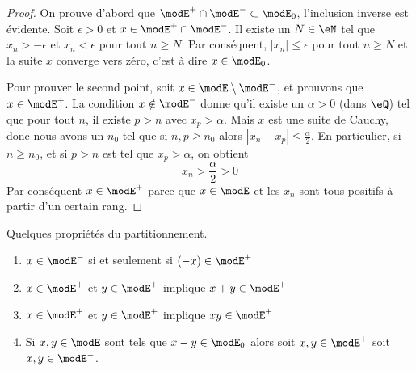 \begin{proof}
    On prouve d'abord que \( \modE^+\cap\modE^-\subset\modE_0\), l'inclusion inverse est évidente. Soit \( \epsilon>0\) et \( x\in \modE^+\cap\modE^-\). Il existe un \( N\in \eN\) tel que \( x_n>-\epsilon\) et \( x_n<\epsilon\) pour tout \( n\geq N\). Par conséquent, \( | x_n |\leq \epsilon\) pour tout \( n\geq N\) et la suite \( x\) converge vers zéro, c'est à dire \( x\in\modE_0\).

    Pour prouver le second point, soit \( x\in \modE\setminus\modE^-\), et prouvons que \( x\in\modE^+\). La condition \( x\notin \modE^-\) donne qu'il existe un \( \alpha>0\) (dans \( \eQ\)) tel que pour tout \( n\), il existe \( p>n\) avec \( x_p>\alpha\). Mais \( x\) est une suite de Cauchy, donc nous avons un \( n_0\) tel que si \( n,p\geq n_0\) alors \( | x_n-x_p |\leq \frac{ \alpha }{2}\). En particulier, si \( n\geq n_0\), et si \( p>n\) est tel que \( x_p>\alpha\), on obtient
    \begin{equation}
        x_n>\frac{ \alpha }{2}>0
    \end{equation}
    Par conséquent \( x\in\modE^+\) parce que \( x\in\modE\) et les \( x_n \) sont tous positifs à partir d'un certain rang.
\end{proof}

\begin{lemma}
    Quelques propriétés du partitionnement.
    \begin{enumerate}
        \item
            \( x\in\modE^-\) si et seulement si \( (-x)\in\modE^+\)
        \item
            \( x\in\modE^+\) et \( y\in\modE^+\) implique \( x+y\in\modE^+\)
        \item
            \( x\in\modE^+\) et \( y\in\modE^+\) implique \( xy\in\modE^+\)
        \item
            Si \( x,y\in\modE\) sont tels que \( x-y\in\modE_0\) alors soit \( x,y\in\modE^+\) soit \( x,y\in\modE^-\).
    \end{enumerate}
\end{lemma}

